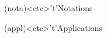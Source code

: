 \documentclass[../../main/main.tex]{subfiles}
\begin{document}
\begin{tcn}[%
		sidebyside, fontupper=\small, fontlower=\small
	]
	\begin{tcn}[nsp](nota)<ctc>'t'{Notations}
		\vspace{-25pt}
	\end{tcn}
	\begin{tcn}[nsp](appl)<ctc>'t'{Applications}
		\vspace{-25pt}
	\end{tcn}

\end{tcn}
\end{document}
